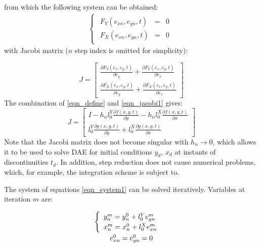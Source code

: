 \documentclass[lettersize,journal]{IEEEtran}
\begin{document}
\noindent from which the following system can be obtained:
\begin{equation}
	\label{eqn_system1}
	\begin{array}{c}
		\begin{cases}
			\begin{array}{rcl}
			F_Y(e_{xn}, e_{yn}, t) &=&0 \\
			F_X(e_{xn}, e_{yn}, t) &=&0 
			\end{array}
		\end{cases} 
	\end{array}
\end{equation}
\noindent with Jacobi matrix (\(n\) step index is omitted for simplicity):

\begin{equation}
	\label{eqn_jacobi1}
	J = \begin{bmatrix}
		\frac{\partial F_Y(e_x, e_y, t)}{\partial e_y}  +  \frac{\partial F_Y(e_x, e_y, t)}{\partial e_x} \\
		\frac{\partial F_X(e_x, e_y, t)}{\partial e_y}  +  \frac{\partial F_X(e_x, e_y, t)}{\partial e_x}
	\end{bmatrix}
\end{equation}
The combination of \eqref{eqn_define} and \eqref{eqn_jacobi1} gives:
\begin{equation}
	\label{eqn_jacobi2}
	J = \begin{bmatrix}
		I - h_nl_0^Y\frac{\partial f(x, y, t)}{\partial y}  -  h_nl_0^X\frac{\partial f(x, y, t)}{\partial x} \\
		l_0^Y\frac{\partial g(x, y, t)}{\partial y} +  l_0^X\frac{\partial g(x, y, t)}{\partial x} 
	\end{bmatrix}
\end{equation}
Note that the Jacobi matrix does not become singular with \(h_n\rightarrow 0\), which allows it to be used to solve DAE for initial conditions \(y_d\), \(x_d\) at instants of discontinuities \(t_d\). In addition, step reduction does not cause numerical problems, which, for example, the integration scheme \cite{petzold82} is subject to.

The system of equations \eqref{eqn_system1} can be solved iteratively. Variables at iteration \(m\) are:

\begin{equation}
	\label{eqn_mitervars}
	\begin{array}{c}
		\def\arraystretch{1.3}
		\begin{array}{c}
			\begin{cases}
				\begin{array}{l}
					y_n^m =y_n^0+l_0^Ye_{yn}^m \\
					x_n^m =x_n^0+l_0^Xe_{xn}^m \\
				\end{array} \\
			\end{cases} \\
			e_{xn}^0=e_{yn}^0= 0 
		\end{array}
	\end{array}
\end{equation}
\end{document}
